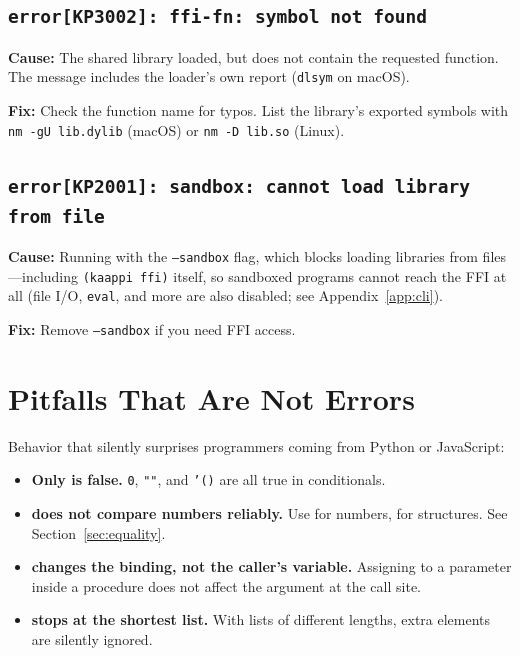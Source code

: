 \subsection{\texttt{error[KP3002]: ffi-fn: symbol not found}}

\textbf{Cause:} The shared library loaded, but does not contain the requested function. The message includes the loader's own report (\texttt{dlsym} on macOS).

\textbf{Fix:} Check the function name for typos. List the library's exported symbols with \texttt{nm -gU lib.dylib} (macOS) or \texttt{nm -D lib.so} (Linux).

\subsection{\texttt{error[KP2001]: sandbox: cannot load library from file}}

\textbf{Cause:} Running with the \texttt{--sandbox} flag, which blocks loading libraries from files---including \texttt{(kaappi ffi)} itself, so sandboxed programs cannot reach the FFI at all (file I/O, \texttt{eval}, and more are also disabled; see Appendix~\ref{app:cli}).

\textbf{Fix:} Remove \texttt{--sandbox} if you need FFI access.

\section{Pitfalls That Are Not Errors}

Behavior that silently surprises programmers coming from Python or JavaScript:

\begin{itemize}
    \item \textbf{Only  is false.} \texttt{0}, \texttt{""}, and \texttt{'()} are all true in conditionals.
    \item \textbf{ does not compare numbers reliably.} Use \code{=} for numbers,  for structures. See Section~\ref{sec:equality}.
    \item \textbf{ changes the binding, not the caller's variable.} Assigning to a parameter inside a procedure does not affect the argument at the call site.
    \item \textbf{ stops at the shortest list.} With lists of different lengths, extra elements are silently ignored.
\end{itemize}


